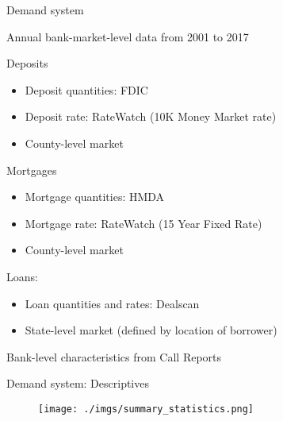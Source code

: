 \documentclass[notes,11pt, aspectratio=169]{beamer}
\newenvironment{wideitemize}{\itemize\addtolength{\itemsep}{10pt}}{\enditemize}
\begin{document}
\begin{frame}{Demand system}
    \vspace{0.2cm}
    \begin{wideitemize}
\item Annual bank-market-level data from 2001 to 2017
\item  Deposits
\begin{itemize}
    \item Deposit quantities: FDIC
    \item Deposit rate: RateWatch (10K Money Market rate)
   \item County-level market
   \end{itemize}
\item  Mortgages
\begin{itemize}
    \item  Mortgage quantities: HMDA
    \item Mortgage rate: RateWatch (15 Year Fixed Rate)
     \item  County-level market
\end{itemize}
\item Loans:
\begin{itemize}
\item Loan quantities and rates: Dealscan
\item State-level market (defined by location of borrower)
\end{itemize}
\item Bank-level characteristics from Call Reports
    \end{wideitemize}
\end{frame}

\begin{frame}{Demand system: Descriptives}
    \vspace{0.5cm}
      
        \begin{figure}[t*]
          \centering
    
          \texttt{[image: ./imgs/summary\_statistics.png]}
       
        \end{figure}

        
      \end{frame}
\end{document}
